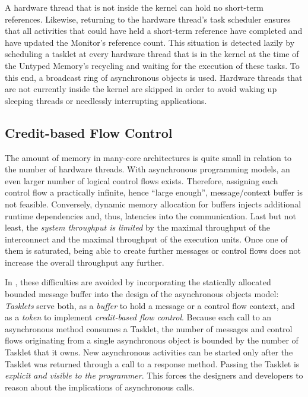 A hardware thread that is not inside the kernel can hold no short-term references. Likewise, returning to the hardware thread's task scheduler ensures that all activities that could have held a short-term reference have completed and have updated the Monitor's reference count. This situation is detected lazily by scheduling a tasklet at every hardware thread that is in the kernel at the time of the Untyped Memory's recycling and waiting for the execution of these tasks. To this end, a broadcast ring of asynchronous objects is used. Hardware threads that are not currently inside the kernel are skipped in order to avoid waking up sleeping threads or needlessly interrupting applications.

\subsection{Credit-based Flow Control}
\label{sec:credit-flow-dyn}

The amount of memory in many-core architectures is quite small in relation to the number of hardware threads. With asynchronous programming models, an even larger number of logical control flows exists.
Therefore, assigning each control flow a practically infinite, hence ``large enough'', message/context buffer is not feasible. Conversely, dynamic memory allocation for buffers injects additional runtime dependencies  and, thus, latencies into the communication.
Last but not least, the \emph{system throughput is limited} by the maximal throughput of the interconnect and the maximal throughput of the execution units. Once one of them is saturated, being able to create further messages or control flows does not increase the overall throughput any further.

In \mythos, these difficulties are avoided by incorporating the statically allocated bounded message buffer into the design of the asynchronous objects model:
\hspace{0px}
\emph{Tasklets} serve both, as a \emph{buffer} to hold a message or a control flow context, and as a \emph{token} to implement \emph{credit-based flow control}.
Because each call to an asynchronous method consumes a Tasklet, the number of messages and control flows originating from a single asynchronous object is bounded by the number of Tasklet that it owns. New asynchronous activities can be started only after the Tasklet was returned through a call to a response method.
Passing the Tasklet is \emph{explicit and visible to the programmer}. This forces the designers and developers to reason about the implications of asynchronous calls.


